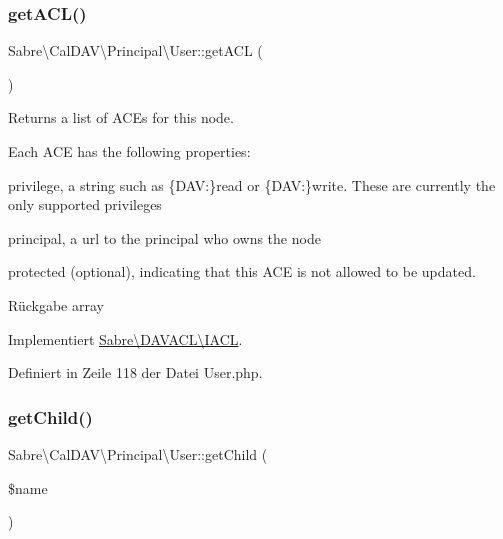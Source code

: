 \subsubsection{\texorpdfstring{get\+A\+C\+L()}{getACL()}}
{\footnotesize\ttfamily Sabre\textbackslash{}\+Cal\+D\+A\+V\textbackslash{}\+Principal\textbackslash{}\+User\+::get\+A\+CL (\begin{DoxyParamCaption}{ }\end{DoxyParamCaption})}

Returns a list of A\+CE\textquotesingle{}s for this node.

Each A\+CE has the following properties\+:
\begin{DoxyItemize}
\item \textquotesingle{}privilege\textquotesingle{}, a string such as \{D\+AV\+:\}read or \{D\+AV\+:\}write. These are currently the only supported privileges
\item \textquotesingle{}principal\textquotesingle{}, a url to the principal who owns the node
\item \textquotesingle{}protected\textquotesingle{} (optional), indicating that this A\+CE is not allowed to be updated.
\end{DoxyItemize}

\begin{DoxyReturn}{Rückgabe}
array 
\end{DoxyReturn}


Implementiert \mbox{\hyperlink{interface_sabre_1_1_d_a_v_a_c_l_1_1_i_a_c_l_a8fe3b3a5b48eae789d7eb722b340045c}{Sabre\textbackslash{}\+D\+A\+V\+A\+C\+L\textbackslash{}\+I\+A\+CL}}.



Definiert in Zeile 118 der Datei User.\+php.

\mbox{\label{class_sabre_1_1_cal_d_a_v_1_1_principal_1_1_user_a8cfa81741e17a5489ea7c33306407d72}} 
\subsubsection{\texorpdfstring{get\+Child()}{getChild()}}
{\footnotesize\ttfamily Sabre\textbackslash{}\+Cal\+D\+A\+V\textbackslash{}\+Principal\textbackslash{}\+User\+::get\+Child (\begin{DoxyParamCaption}\item[{}]{\$name }\end{DoxyParamCaption})}

